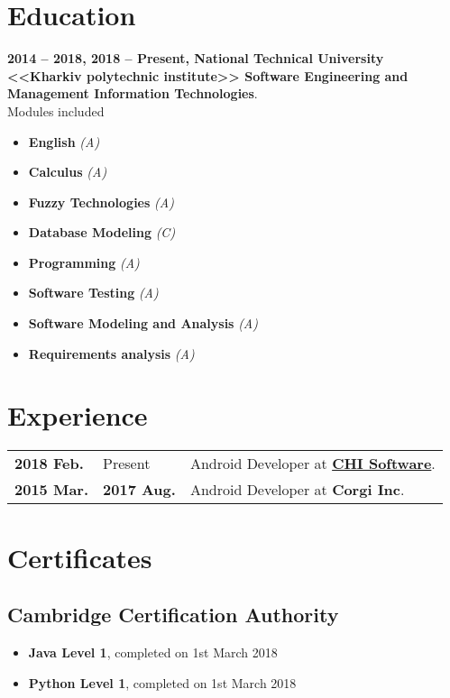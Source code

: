 \documentclass[a4paper]{article}
\begin{document}
	\section*{Education}
	\textbf{2014 -- 2018, 2018 -- Present, National Technical University <<Kharkiv polytechnic institute>> Software Engineering and Management Information Technologies}. \\
	Modules included 
	\begin{multicols}{2}
	\begin{itemize}
		\item \textbf{English} \textit{(A)}
		\item \textbf{Calculus} \textit{(A)}
		\item \textbf{Fuzzy Technologies} \textit{(A)}
		\item \textbf{Database Modeling} \textit{(C)}
		\item \textbf{Programming} \textit{(A)}
		\item \textbf{Software Testing} \textit{(A)}
		\item \textbf{Software Modeling and Analysis} \textit{(A)}
		\item \textbf{Requirements analysis} \textit{(A)}
	\end{itemize}
	\end{multicols}

	\section*{Experience}
	\begin{tabular}{@{}l@{\enspace--\enspace}ll}
		\textbf{2018 Feb.} & Present & Android Developer at \href{https://chisw.com}{\textbf{CHI Software}}. \\
		\textbf{2015 Mar.} & \textbf{2017 Aug.} & Android Developer at \textbf{Corgi Inc}. \\
	\end{tabular}
	
	\section*{Certificates}
	\subsection*{Cambridge Certification Authority}
	\begin{itemize}
		\item \textbf{Java Level 1}, completed on 1st March 2018
		\item \textbf{Python Level 1}, completed on 1st March 2018
	\end{itemize}
\end{document}
